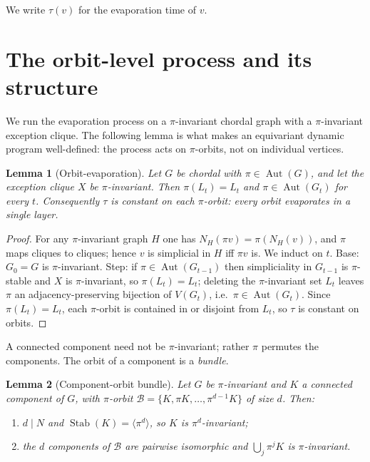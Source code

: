 \documentclass[11pt]{article}
\theoremstyle{plain}
\newtheorem{lemma}{Lemma}
\theoremstyle{definition}
\DeclareMathOperator{\Aut}{Aut}
\DeclareMathOperator{\Stab}{Stab}
\newcommand{\orb}{\mathcal{B}}
\begin{document}
We write $\tau(v)$ for the evaporation time of $v$.

\section{The orbit-level process and its structure}

We run the evaporation process on a $\pi$-invariant chordal graph with a $\pi$-invariant exception
clique. The following lemma is what makes an equivariant dynamic program well-defined: the process
acts on $\pi$-orbits, not on individual vertices.

\begin{lemma}[Orbit-evaporation]\label{lem:orbit}
Let $G$ be chordal with $\pi\in\Aut(G)$, and let the exception clique $X$ be $\pi$-invariant. Then
$\pi(L_t)=L_t$ and $\pi\in\Aut(G_t)$ for every $t$. Consequently $\tau$ is constant on each
$\pi$-orbit: every orbit evaporates in a single layer.
\end{lemma}

\begin{proof}
For any $\pi$-invariant graph $H$ one has $N_H(\pi v)=\pi(N_H(v))$, and $\pi$ maps cliques to
cliques; hence $v$ is simplicial in $H$ iff $\pi v$ is. We induct on $t$. Base: $G_0=G$ is
$\pi$-invariant. Step: if $\pi\in\Aut(G_{t-1})$ then simpliciality in $G_{t-1}$ is $\pi$-stable and
$X$ is $\pi$-invariant, so $\pi(L_t)=L_t$; deleting the $\pi$-invariant set $L_t$ leaves $\pi$ an
adjacency-preserving bijection of $V(G_t)$, i.e.\ $\pi\in\Aut(G_t)$. Since $\pi(L_t)=L_t$, each
$\pi$-orbit is contained in or disjoint from $L_t$, so $\tau$ is constant on orbits.
\end{proof}

A connected component need not be $\pi$-invariant; rather $\pi$ permutes the components. The orbit of
a component is a \emph{bundle}.

\begin{lemma}[Component-orbit bundle]\label{lem:bundle}
Let $G$ be $\pi$-invariant and $K$ a connected component of $G$, with $\pi$-orbit
$\orb=\{K,\pi K,\dots,\pi^{d-1}K\}$ of size $d$. Then:
\begin{enumerate}[topsep=1pt,itemsep=0pt,label=\textup{(\roman*)}]
\item $d\mid N$ and $\Stab(K)=\langle\pi^{d}\rangle$, so $K$ is $\pi^{d}$-invariant;
\item the $d$ components of $\orb$ are pairwise isomorphic and $\bigcup_j\pi^jK$ is $\pi$-invariant.
\end{enumerate}
\end{lemma}
\end{document}
